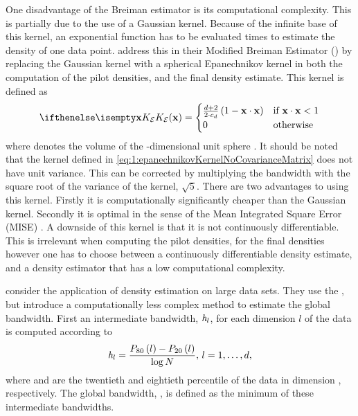 	One disadvantage of the Breiman estimator is its computational complexity. This is partially due to the use of a Gaussian kernel. Because of the infinite base of this kernel, an exponential function has to be evaluated \varNumPatterns times to estimate the density of one data point.
	\textcite{wilkinson1995dataplot} address this in their Modified Breiman Estimator (\mbe) by replacing the Gaussian kernel with a spherical Epanechnikov kernel in both the computation of the pilot densities, and the final density estimate. This kernel is defined as
	\begin{equation}\label{eq:1:epanechnikovKernelNoCovarianceMatrix}
		\varKernel[\varEpan]{\varPattern} =
		\begin{cases}
			\frac{\varDim + 2}{2\cdot\varUnitSphere{\varDim}} \left( 1 - \varPattern \cdot \varPattern \right) & \text{if } \varPattern \cdot \varPattern < 1\\
			0 & \text{otherwise}
		\end{cases}
	\end{equation}
	 where \varUnitSphere{\varDim} denotes the volume of the \varDim-dimensional unit sphere \cite{epanechnikov1969non}. It should be noted that the kernel defined in \cref{eq:1:epanechnikovKernelNoCovarianceMatrix} does not have unit variance. This can be corrected by multiplying the bandwidth \varBandwidth with the square root of the variance of the kernel, \mbox{\ie $\sqrt{5}$}. There are two advantages to using this kernel. Firstly it is computationally significantly cheaper than the Gaussian kernel. Secondly it is optimal in the sense of the Mean Integrated Square Error (MISE) \cite{epanechnikov1969non}. A downside of this kernel is that it is not continuously differentiable. This is irrelevant when computing the pilot densities, for the final densities however one has to choose between a continuously differentiable density estimate, and a density estimator that has a low computational complexity.

	\textcite{ferdosi2011comparison} consider the application of density estimation on large data sets. They use the \mbe, but introduce a computationally less complex method to estimate the global bandwidth. First an intermediate bandwidth, $\mathit{h}_{l}$, for each dimension $l$ of the data is computed according to
	\begin{equation}\label{eq:1:ferdosiGeneralBandwidth}
			\mathit{h}_{l} = \frac{P_{80}\left( l \right) - P_{20}\left( l \right)}{\log N}, \, l = 1, \dotsc, d,
		\end{equation}
	where  and  are the twentieth and eightieth percentile of the data in dimension \itDim, respectively. The global bandwidth, \varBandwidth, is defined as the minimum of these intermediate bandwidths.

